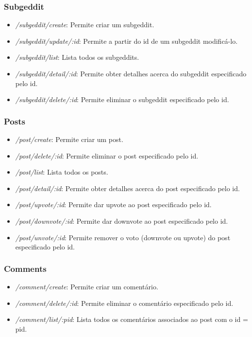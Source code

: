 \documentclass{article}
\begin{document}
	\subsubsection{Subgeddit}
	
	\begin{itemize}
		\item \textit{/subgeddit/create}: Permite criar um subgeddit.
		\item \textit{/subgeddit/update/:id}: Permite a partir do id de um subgeddit modificá-lo.
		\item \textit{/subgeddit/list}: Lista todos os subgeddits.
		\item \textit{/subgeddit/detail/:id}: Permite obter detalhes acerca do subgeddit especificado pelo id.
		\item \textit{/subgeddit/delete/:id}: Permite eliminar o subgeddit especificado pelo id.
	\end{itemize}
	
	\subsubsection{Posts}
	
	\begin{itemize}
		\item \textit{/post/create}: Permite criar um post.
		\item \textit{/post/delete/:id}: Permite eliminar o post especificado pelo id.
		\item \textit{/post/list}: Lista todos os posts.
		\item \textit{/post/detail/:id}: Permite obter detalhes acerca do post especificado pelo id.
		\item \textit{/post/upvote/:id}: Permite dar upvote ao post especificado pelo id.
		\item \textit{/post/downvote/:id}: Permite dar downvote ao post especificado pelo id.
		\item \textit{/post/unvote/:id}: Permite remover o voto (downvote ou upvote) do post especificado pelo id.
	\end{itemize}
	
	\subsubsection{Comments}
	
	\begin{itemize}
		\item \textit{/comment/create}: Permite criar um comentário.
		\item \textit{/comment/delete/:id}: Permite eliminar o comentário especificado pelo id.
		\item \textit{/comment/list/:pid}: Lista todos os comentários associados ao post com o id = pid.
	\end{itemize}
	
\end{document}
